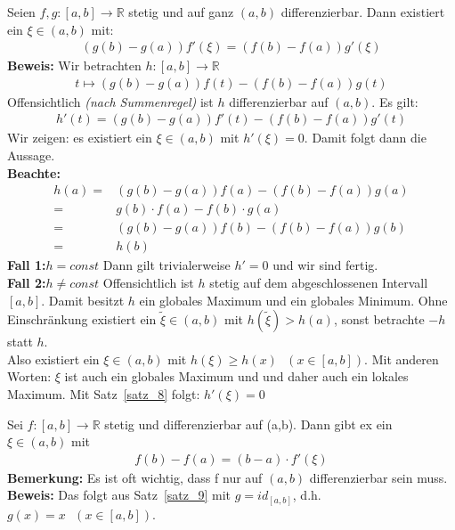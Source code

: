 
\begin{Satz}{
	\label{satz_9}
	Seien $f,g : [a,b] \rightarrow \mathbb{R}$ stetig und auf ganz 
	$\left( a, b \right)$ differenzierbar. Dann existiert ein 
	$\xi \in (a,b) $ mit:
	\begin{align*}
		\left( g(b)- g(a)\right)f'(\xi) = 
		\left( f(b) - f(a) \right) g'(\xi)
	\end{align*}
	\textbf{Beweis:} Wir betrachten $h: [a,b] \rightarrow \mathbb{R}$ 
	\begin{align*}
		t \mapsto \left( g(b) -g(a)\right)f(t) - \left(f(b)-f(a)\right)g(t)
	\end{align*}
	Offensichtlich \textit{(nach Summenregel)} ist $h$ differenzierbar auf $(a,b)$.
	Es gilt:
	\begin{align*}
		h'(t) = \left(g(b)-g(a)\right)f'(t) - \left(f(b)-f(a)\right)g'(t)
	\end{align*}
	Wir zeigen: es existiert ein $\xi \in (a,b)$ mit $h'(\xi) = 0$. Damit folgt 
	dann die Aussage. \\
	\textbf{Beachte:} 
	\begin{align*}
		h(a) = & \left(g(b)-g(a)\right)f(a) - \left(f(b)-f(a)\right)g(a) \\
		= & g(b) \cdot f(a) - f(b) \cdot g(a) \\
		= & \left(g(b) - g(a)\right)f(b) - \left(f(b)-f(a)\right)g(b) \\
		= & h(b)
	\end{align*}
	\textbf{Fall 1:}$h = const$ Dann gilt trivialerweise $h' = 0$ 
	und wir sind fertig. \\
	\textbf{Fall 2:}$h \neq const$ Offensichtlich ist $h$ stetig auf dem 
	abgeschlossenen Intervall $[a,b]$. Damit besitzt $h$ ein globales Maximum und 
	ein globales Minimum. Ohne Einschränkung existiert ein $\tilde{\xi} \in (a,b)$
	 mit $h(\tilde{\xi}) > h(a)$, sonst betrachte $-h$ statt $h$. \\
	 Also existiert ein $\xi \in (a,b)$ mit $h(\xi) \geq h(x)\textbf{ }
	  (x \in [a,b])$. 
	 Mit anderen Worten: $\xi$ ist auch ein globales Maximum und und daher auch 
	 ein lokales Maximum. Mit Satz~\ref{satz_8}
	 folgt: $h'(\xi) = 0$
	 
}\end{Satz}
	
\begin{Satz}{
	Sei $f: [a,b] \rightarrow \mathbb{R}$ stetig und differenzierbar auf 
	(a,b). Dann gibt ex ein $\xi \in (a,b)$ mit 
	\begin{align*}
		f(b) -f(a) = (b-a) \cdot f'(\xi)
	\end{align*}
	\textbf{Bemerkung:} Es ist oft wichtig, dass f nur auf $(a,b)$ differenzierbar 
	sein muss. \\
	\textbf{Beweis:} Das folgt aus Satz~\ref{satz_9}
	mit $g = id_{[a,b]}$, d.h. $g(x) = x \textbf{ } (x \in [a,b])$.
}\end{Satz}

